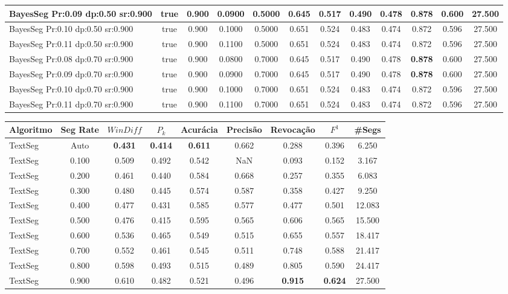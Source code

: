 \documentclass{article}
\begin{document}
\begin{longtable}[c]{|l|c|c|c|c|c|c|c|c|c|c|c|}
 BayesSeg Pr:0.09 dp:0.50 sr:0.900 & true & 0.900 & 0.0900 & 0.5000 & 0.645 & 0.517 & 0.490 & 0.478 & \cellcolor{gray!20} \textbf{0.878} & 0.600 & 27.500  \\ \hline 
 BayesSeg Pr:0.10 dp:0.50 sr:0.900 & true & 0.900 & 0.1000 & 0.5000 & 0.651 & 0.524 & 0.483 & 0.474 & 0.872 & 0.596 & 27.500  \\ \hline 
 BayesSeg Pr:0.11 dp:0.50 sr:0.900 & true & 0.900 & 0.1100 & 0.5000 & 0.651 & 0.524 & 0.483 & 0.474 & 0.872 & 0.596 & 27.500  \\ \hline 
 BayesSeg Pr:0.08 dp:0.70 sr:0.900 & true & 0.900 & 0.0800 & 0.7000 & 0.645 & 0.517 & 0.490 & 0.478 & \cellcolor{gray!20} \textbf{0.878} & 0.600 & 27.500  \\ \hline 
 BayesSeg Pr:0.09 dp:0.70 sr:0.900 & true & 0.900 & 0.0900 & 0.7000 & 0.645 & 0.517 & 0.490 & 0.478 & \cellcolor{gray!20} \textbf{0.878} & 0.600 & 27.500  \\ \hline 
 BayesSeg Pr:0.10 dp:0.70 sr:0.900 & true & 0.900 & 0.1000 & 0.7000 & 0.651 & 0.524 & 0.483 & 0.474 & 0.872 & 0.596 & 27.500  \\ \hline 
 BayesSeg Pr:0.11 dp:0.70 sr:0.900 & true & 0.900 & 0.1100 & 0.7000 & 0.651 & 0.524 & 0.483 & 0.474 & 0.872 & 0.596 & 27.500  \\ \hline 
 \end{longtable} 
\newpage
\begin{longtable}[c]{|l|c|c|c|c|c|c|c|c|} 
\hline 
Algoritmo & Seg Rate & $WinDiff$ & $P_k$ & Acurácia & Precisão & Revocação & $F^1$ & \#Segs\\ \hline 
TextSeg & Auto & \cellcolor{gray!20} \textbf{0.431} & \cellcolor{gray!20} \textbf{0.414} & \cellcolor{gray!20} \textbf{0.611} & 0.662 & 0.288 & 0.396 & 6.250  \\ \hline 
 TextSeg & 0.100 & 0.509 & 0.492 & 0.542 & NaN & 0.093 & 0.152 & 3.167  \\ \hline 
 TextSeg & 0.200 & 0.461 & 0.440 & 0.584 & 0.668 & 0.257 & 0.355 & 6.083  \\ \hline 
 TextSeg & 0.300 & 0.480 & 0.445 & 0.574 & 0.587 & 0.358 & 0.427 & 9.250  \\ \hline 
 TextSeg & 0.400 & 0.477 & 0.431 & 0.585 & 0.577 & 0.477 & 0.501 & 12.083  \\ \hline 
 TextSeg & 0.500 & 0.476 & 0.415 & 0.595 & 0.565 & 0.606 & 0.565 & 15.500  \\ \hline 
 TextSeg & 0.600 & 0.536 & 0.465 & 0.549 & 0.515 & 0.655 & 0.557 & 18.417  \\ \hline 
 TextSeg & 0.700 & 0.552 & 0.461 & 0.545 & 0.511 & 0.748 & 0.588 & 21.417  \\ \hline 
 TextSeg & 0.800 & 0.598 & 0.493 & 0.515 & 0.489 & 0.805 & 0.590 & 24.417  \\ \hline 
 TextSeg & 0.900 & 0.610 & 0.482 & 0.521 & 0.496 & \cellcolor{gray!20} \textbf{0.915} & \cellcolor{gray!20} \textbf{0.624} & 27.500  \\ \hline 
 \end{longtable} 
\end{document}
